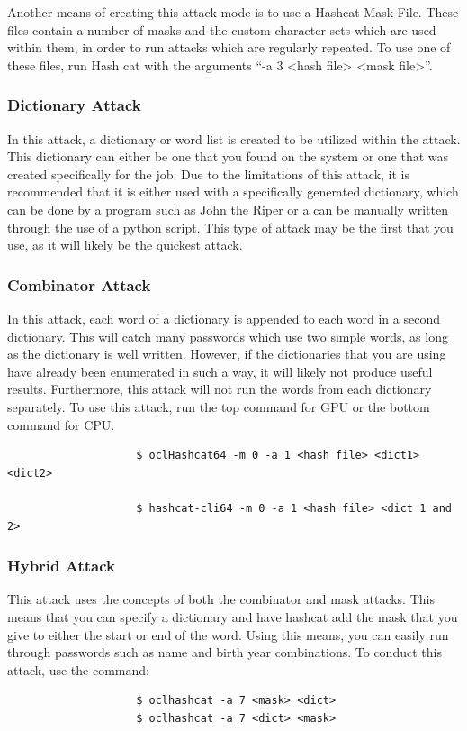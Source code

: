				Another means of creating this attack mode is to use a Hashcat Mask File.
				These files contain a number of masks and the custom character sets which are used within them, in order to run attacks which are regularly repeated.
				To use one of these files, run Hash cat with the arguments ``-a 3 <hash file> <mask file>''.

			\subsubsection{Dictionary Attack}
				In this attack, a dictionary or word list is created to be utilized within the attack.
				This dictionary can either be one that you found on the system or one that was created specifically for the job.
				Due to the limitations of this attack, it is recommended that it is either used with a specifically generated dictionary, which can be done by a program such as John the Riper or
				a can be manually written through the use of a python script.
				This type of attack may be the first that you use, as it will likely be the quickest attack.
			\subsubsection{Combinator Attack}
				In this attack, each word of a dictionary is appended to each word in a second dictionary.
				This will catch many passwords which use two simple words, as long as the dictionary is well written.
				However, if the dictionaries that you are using have already been enumerated in such a way, it will likely not produce useful results.
				Furthermore, this attack will not run the words from each dictionary separately.
				To use this attack, run the top command for GPU or the bottom command for CPU.
				\begin{verbatim}
					$ oclHashcat64 -m 0 -a 1 <hash file> <dict1> <dict2>

					$ hashcat-cli64 -m 0 -a 1 <hash file> <dict 1 and 2>
				\end{verbatim}
			\subsubsection{Hybrid Attack}
				This attack uses the concepts of both the combinator and mask attacks.
				This means that you can specify a dictionary and have hashcat add the mask that you give to either the start or end of the word.
				Using this means, you can easily run through passwords such as name and birth year combinations.
				To conduct this attack, use the command:
				\begin{verbatim}
					$ oclhashcat -a 7 <mask> <dict>
					$ oclhashcat -a 7 <dict> <mask>
				\end{verbatim}

